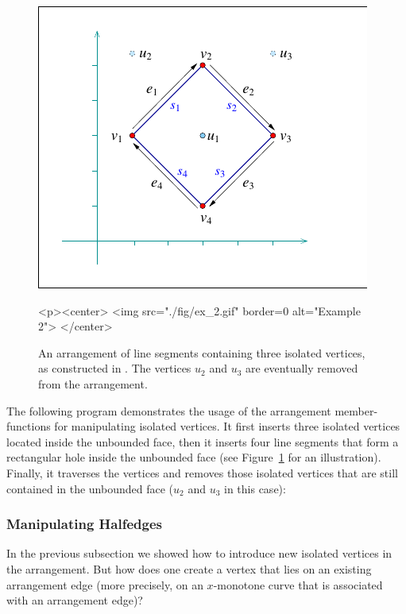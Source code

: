 \begin{figure}[!htp]
\begin{ccTexOnly}
  \begin{center}
  \includegraphics{Arrangement_2/fig/ex_2}
  \end{center}
\end{ccTexOnly}
\begin{ccHtmlOnly}
  <p><center>
  <img src="./fig/ex_2.gif" border=0 alt="Example 2">
  </center>
\end{ccHtmlOnly}
\caption{An arrangement of line segments containing three isolated
vertices, as constructed in . The vertices $u_2$
and $u_3$ are eventually removed from the arrangement.}
\label{arr_fig:ex_2}
\end{figure}

The following program demonstrates the usage of the arrangement
member-functions for manipulating isolated vertices. It first
inserts three isolated vertices located inside the unbounded face, then
it inserts four line segments that form a rectangular hole inside the
unbounded face (see Figure~\ref{arr_fig:ex_2} for an
illustration). Finally, it traverses the vertices and removes those
isolated vertices that are still contained in the unbounded face
($u_2$ and $u_3$ in this case):


\subsubsection{Manipulating Halfedges}
\label{arr_sssec:mf_halfedges}
%
In the previous subsection we showed how to introduce new isolated
vertices in the arrangement. But how does one create a vertex that
lies on an existing arrangement edge (more precisely, on an
$x$-monotone curve that is associated with an arrangement edge)?

